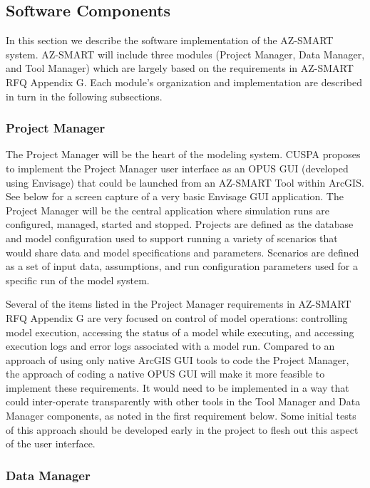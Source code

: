 \subsection{Software Components}

In this section we describe the software implementation of the AZ-SMART system.  AZ-SMART will include three modules (Project Manager, Data Manager, and Tool Manager) which are largely based on the requirements in AZ-SMART RFQ Appendix G. Each module's organization and implementation are described in turn in the following subsections.

\subsubsection{Project Manager}

The Project Manager will be the heart of the modeling system. CUSPA proposes to implement the Project Manager user interface as an OPUS GUI (developed using Envisage) that could be launched from an AZ-SMART Tool within ArcGIS.  See below for a screen capture of a very basic Envisage GUI application.  The Project Manager will be the central application where simulation runs are configured, managed, started and stopped.  Projects are defined as the database and model configuration used to support running a variety of scenarios that would share data and model specifications and parameters.  Scenarios are defined as a set of input data, assumptions, and run configuration parameters used for a specific run of the model system.

Several of the items listed in the Project Manager requirements in AZ-SMART RFQ Appendix G are very focused on control of model operations: controlling model execution, accessing the status of a model while executing, and accessing execution logs and error logs associated with a model run.  Compared to an approach of using only native ArcGIS GUI tools to code the Project Manager, the approach of coding a native OPUS GUI will make it more feasible to implement these requirements.  It would need to be implemented in a way that could inter-operate transparently with other tools in the Tool Manager and Data Manager components, as noted in the first requirement below. Some initial tests of this approach should be developed early in the project to flesh out this aspect of the user interface.

\subsubsection{Data Manager}

